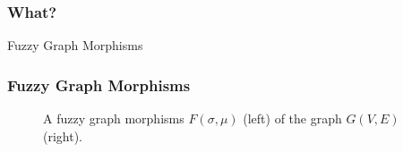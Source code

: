 



\begin{frame}
	\frametitle{What?}

	\begin{block}{Fuzzy Graph Morphisms}
	\end{block}
\end{frame}

\begin{frame}
	\frametitle{Fuzzy Graph Morphisms}

	\begin{figure}[htbp]
		\centering
		\begin{subfigure}[t]{0.52\textwidth}
			\centering
		\end{subfigure}
		\quad
		\begin{subfigure}[t]{0.27\textwidth}
			\centering
		\end{subfigure}
		\caption{A fuzzy graph morphisms  $F(\sigma, \mu)$ (left) of the graph $G(V, E)$ (right).}
	\end{figure}

\end{frame}
